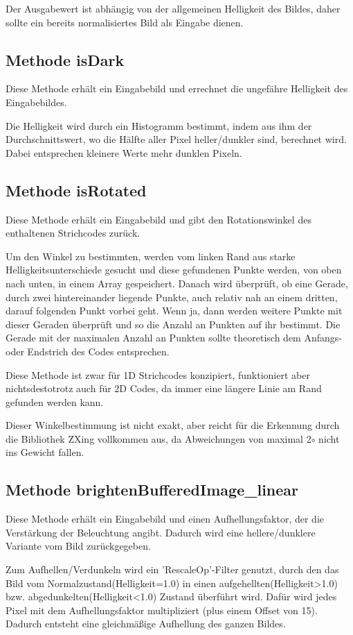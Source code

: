 Der Ausgabewert ist abhängig von der allgemeinen Helligkeit des Bildes, daher sollte ein bereits normalisiertes Bild als Eingabe dienen.


\subsection*{Methode isDark}
Diese Methode erhält ein Eingabebild und errechnet die ungefähre Helligkeit des Eingabebildes.

Die Helligkeit wird durch ein Histogramm bestimmt, indem aus ihm der Durchschnittswert, wo die Hälfte aller Pixel heller/dunkler sind, berechnet wird. Dabei entsprechen kleinere Werte mehr dunklen Pixeln.


\subsection*{Methode isRotated}
Diese Methode erhält ein Eingabebild und gibt den Rotationswinkel des enthaltenen Strichcodes zurück.

Um den Winkel zu bestimmten, werden vom linken Rand aus starke Helligkeitsunterschiede gesucht und diese gefundenen Punkte werden, von oben nach unten, in einem Array gespeichert. Danach wird überprüft, ob eine Gerade, durch zwei hintereinander liegende Punkte, auch relativ nah an einem dritten, darauf folgenden Punkt vorbei geht. Wenn ja, dann werden weitere Punkte mit dieser Geraden überprüft und so die Anzahl an Punkten auf ihr bestimmt. Die Gerade mit der maximalen Anzahl an Punkten sollte theoretisch dem Anfangs- oder Endstrich des Codes entsprechen.

Diese Methode ist zwar für 1D Strichcodes konzipiert, funktioniert aber nichtsdestotrotz auch für 2D Codes, da immer eine längere Linie am Rand gefunden werden kann.

Dieser Winkelbestimmung ist nicht exakt, aber reicht für die Erkennung durch die Bibliothek ZXing vollkommen aus, da Abweichungen von maximal 2$ \circ $ nicht ins Gewicht fallen.
 

\subsection*{Methode brightenBufferedImage\_linear}
Diese Methode erhält ein Eingabebild und einen Aufhellungsfaktor, der die Verstärkung der Beleuchtung angibt. Dadurch wird eine hellere/dunklere Variante vom Bild zurückgegeben.

Zum Aufhellen/Verdunkeln wird ein 'RescaleOp'-Filter genutzt, durch den das Bild vom Normalzustand(Helligkeit=1.0) in einen aufgehellten(Helligkeit>1.0) bzw. abgedunkelten(Helligkeit<1.0) Zustand überführt wird. Dafür wird jedes Pixel mit dem Aufhellungsfaktor multipliziert (plus einem Offset von 15).
Dadurch entsteht eine gleichmäßige Aufhellung des ganzen Bildes.

